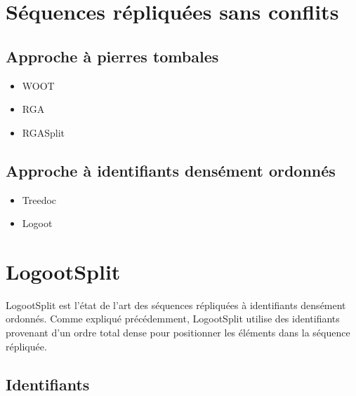 \documentclass[12pt]{thesul}
\begin{document}
\section{Séquences répliquées sans conflits}

\subsection{Approche à pierres tombales}

\begin{itemize}
  \item WOOT \cite{oster:inria-00108523, Weiss_2007, ahmednacer:inria-00629503}
  \item RGA \cite{ROH2011354}
  \item RGASplit \cite{briot:hal-01343941}
\end{itemize}

\subsection{Approche à identifiants densément ordonnés}

\begin{itemize}
  \item Treedoc \cite{5158449}
  \item Logoot \cite{WeissICDCS09, weiss:hal-00450416}
\end{itemize}



\section{LogootSplit}

\label{sec:logootsplit}

LogootSplit \cite{2013-logootsplit} est l'état de l'art des séquences répliquées à identifiants densément ordonnés.
Comme expliqué précédemment, LogootSplit utilise des identifiants provenant d'un ordre total dense pour positionner les éléments dans la séquence répliquée.

\subsection{Identifiants}
\end{document}
